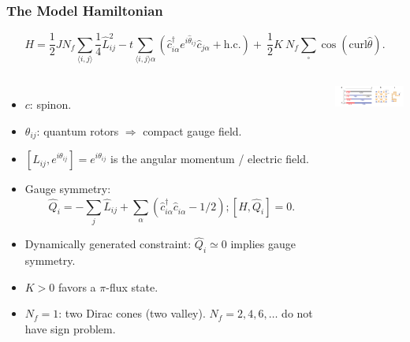 \documentclass[xcolor=table, 10pt, aspectratio=169]{beamer}
\begin{document}
\begin{frame}
  \frametitle{The Model Hamiltonian}
  \[
  H=\frac{1}{2}JN_{f}\sum_{\langle i,j \rangle} \frac 1 4 \hat{L}^{2}_{ij}-t\sum_{\langle i,j \rangle\alpha}\left(\hat{c}^{\dagger}_{i\alpha}e^{i\hat{\theta}_{ij}}\hat{c}_{j\alpha}+\text{h.c.}\right)
  +\ \frac{1}{2}K\ N_f\sum_{\square}\cos \left( \text{curl} \hat{\theta} \right).
\]
\begin{columns}
  \begin{itemize}
    \item $c$: spinon.
    \item $\theta_{ij}$: quantum rotors $\Rightarrow$ compact gauge field.
    \item $[L_{ij}, e^{i\theta_{ij}}]=e^{i\theta_{ij}}$ is the angular momentum / electric field.
    \item Gauge symmetry:
    \[\hat{Q}_{i} = -\sum_{j}\hat{L}_{ij} + \sum_{\alpha} \left( \hat{c}^{\dagger}_{i\alpha}\hat{c}^{\phantom\dagger}_{i\alpha} - 1/2 \right);[H, \hat Q_i] = 0.\]
    \item Dynamically generated constraint:
		$\hat Q_i \simeq 0$ implies gauge symmetry.
    \item $K>0$ favors a $\pi$-flux state.
		\item $N_f=1$: two Dirac cones (two valley). $N_f=2,4,6,\ldots$ do not have sign problem.
  \end{itemize}

  \begin{center}
    \includegraphics[width=3cm]{model}
  \end{center}
\end{columns}
\end{frame}

%
\end{document}

